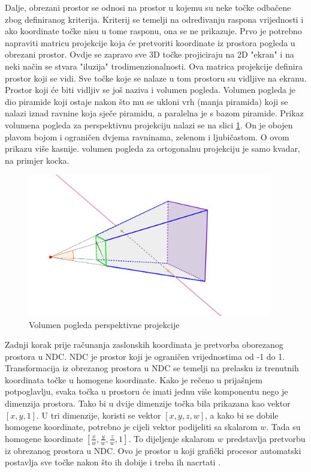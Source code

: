 \documentclass{foi}
\begin{document}
Dalje, obrezani prostor se odnosi na prostor u kojemu su neke točke odbačene zbog definiranog kriterija. Kriterij se temelji na određivanju raspona vrijednosti i ako koordinate točke nisu u tome rasponu, ona se ne prikazuje. Prvo je potrebno napraviti matricu projekcije koja će pretvoriti koordinate iz prostora pogleda u obrezani prostor. Ovdje se zapravo sve 3D točke projiciraju na 2D "ekran" i na neki način se stvara "iluzija" trodimenzionalnosti. Ova matrica projekcije definira prostor koji se vidi. Sve točke koje se nalaze u tom prostoru su vidljive na ekranu. Prostor koji će biti vidljiv se još naziva i volumen pogleda. Volumen pogleda je dio piramide koji ostaje nakon što mu se ukloni vrh (manja piramida) koji se nalazi iznad ravnine koja sječe piramidu, a paralelna je s bazom piramide. Prikaz volumena pogleda za perspektivnu projekciju nalazi se na slici \ref{fig:FrustumPerpspektivneProjekcije}. On je obojen plavom bojom i ograničen dvjema ravninama, zelenom i ljubičastom. O ovom prikazu više kasnije. volumen pogleda za ortogonalnu projekciju je samo kvadar, na primjer kocka.


\begin{figure}[H]
	\centering	\includegraphics[width=0.95\textwidth,trim={4cm 0cm 10cm 0cm},clip]{slike/35_FrustumPerspektivneProjekcije.png}
	\captionsetup{justification=centering}
	\caption{Volumen pogleda perspektivne projekcije}
	\label{fig:FrustumPerpspektivneProjekcije}
\end{figure}

Zadnji korak prije računanja zaslonskih koordinata je pretvorba oborezanog prostora u NDC. NDC je prostor koji je ograničen vrijednostima od -1 do 1. Transformacija iz obrezanog prostora u NDC se temelji na prelasku iz trenutnih koordinata točke u homogene koordinate. Kako je rečeno u prijašnjem potpoglavlju, svaka točka u prostoru će imati jednu više komponentu nego je dimenzija prostora. Tako bi u dvije dimenzije točka bila prikazana kao vektor $[x, y, 1]$. U tri dimenzije, koristi se vektor $[x, y, z, w]$, a kako bi se dobile homogene koordinate, potrebno je cijeli vektor podijeliti sa skalarom $w$. Tada su homogene koordinate $[\frac{x}{w},\frac {y}{w}, \frac{z}{w}, 1]$. To dijeljenje skalarom $w$ predstavlja pretvorbu iz obrezanog prostora u NDC. Ovo je prostor u koji grafički procesor automatski postavlja sve točke nakon što ih dobije i treba ih nacrtati \parencite{Prostori3DBezDat}. 
\end{document}
